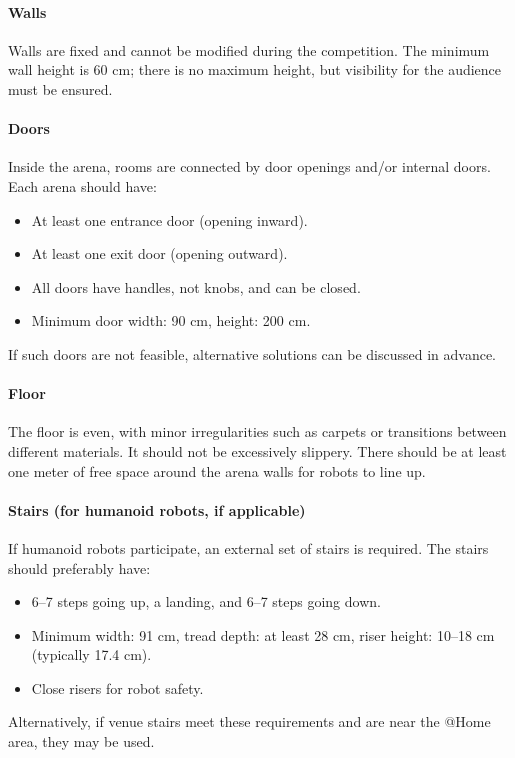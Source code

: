 \paragraph{Walls} Walls are fixed and cannot be modified during the competition. The minimum wall height is 60 cm; there is no maximum height, but visibility for the audience must be ensured.

\paragraph{Doors} Inside the arena, rooms are connected by door openings and/or internal doors. Each arena should have:
\begin{itemize}
    \item At least one entrance door (opening inward).
    \item At least one exit door (opening outward).
    \item All doors have handles, not knobs, and can be closed.
    \item Minimum door width: 90 cm, height: 200 cm.
\end{itemize}
If such doors are not feasible, alternative solutions can be discussed in advance.

\paragraph{Floor} The floor is even, with minor irregularities such as carpets or transitions between different materials. It should not be excessively slippery. There should be at least one meter of free space around the arena walls for robots to line up.

\paragraph{Stairs (for humanoid robots, if applicable)} If humanoid robots participate, an external set of stairs is required. The stairs should preferably have:
\begin{itemize}
    \item 6--7 steps going up, a landing, and 6--7 steps going down.
    \item Minimum width: 91 cm, tread depth: at least 28 cm, riser height: 10--18 cm (typically 17.4 cm).
    \item Close risers for robot safety.
\end{itemize}
Alternatively, if venue stairs meet these requirements and are near the @Home area, they may be used.


